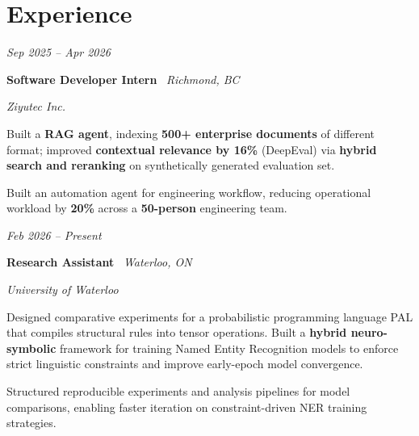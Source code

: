 \section{Experience}

    \begin{twocolentry}{

    \textit{Sep 2025 -- Apr 2026}}
        \textbf{Software Developer Intern} \textbar\ \textit{Richmond, BC}
        
        \textit{Ziyutec Inc.}
    \end{twocolentry}

    \vspace{0.10 cm}
    \begin{onecolentry}
        \begin{highlights}
    
    \item Built a \textbf{RAG agent}, indexing \textbf{500+ enterprise documents} of different format; improved \textbf{contextual relevance by 16\%} (DeepEval) via \textbf{hybrid search and reranking} on synthetically generated evaluation set.

    \item Built an automation agent for engineering workflow, reducing operational workload by \textbf{20\%} across a \textbf{50-person} engineering team.

        
        \end{highlights}
    \end{onecolentry}
\vspace{0.2cm}    \begin{twocolentry}{

    \textit{Feb 2026 -- Present}}
        \textbf{Research Assistant} \textbar\ \textit{Waterloo, ON}
        
        \textit{University of Waterloo}
    \end{twocolentry}

    \vspace{0.10 cm}
    \begin{onecolentry}
        \begin{highlights}
    
    \item Designed comparative experiments for a probabilistic programming language PAL that compiles structural rules into tensor operations. Built a \textbf{hybrid neuro-symbolic} framework for training Named Entity Recognition models to enforce strict linguistic constraints and improve early-epoch model convergence.

    \item Structured reproducible experiments and analysis pipelines for model comparisons, enabling faster iteration on constraint-driven NER training strategies.

        
        \end{highlights}
    \end{onecolentry}
